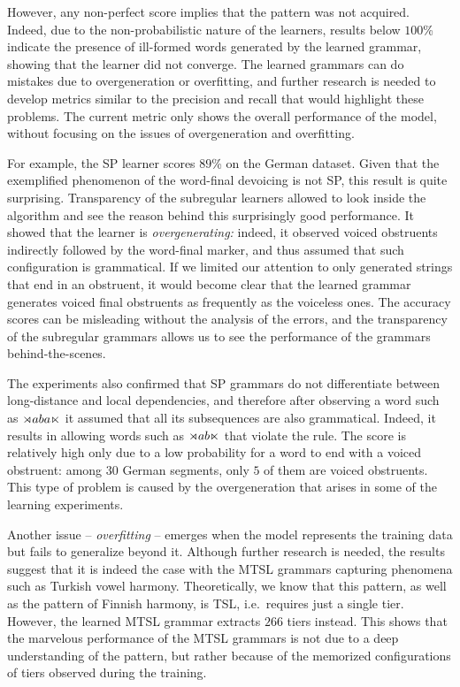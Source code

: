 However, any non-perfect score implies that the pattern was not acquired.
Indeed, due to the non-probabilistic nature of the learners, results below $100$\% indicate the presence of ill-formed words generated by the learned grammar, showing that the learner did not converge.
The learned grammars can do mistakes due to overgeneration or overfitting, and further research is needed to develop metrics similar to the precision and recall that would highlight these problems.
The current metric only shows the overall performance of the model, without focusing on the issues of overgeneration and overfitting.

For example, the SP learner scores $89$\% on the German dataset. 
Given that the exemplified phenomenon of the word-final devoicing is not SP, this result is quite surprising.
Transparency of the subregular learners allowed to look inside the algorithm and see the reason behind this surprisingly good performance. 
It showed that the learner is \emph{overgenerating:} indeed, it observed voiced obstruents indirectly followed by the word-final marker, and thus assumed that such configuration is grammatical.
If we limited our attention to only generated strings that end in an obstruent, it would become clear that the learned grammar generates voiced final obstruents as frequently as the voiceless ones.
The accuracy scores can be misleading without the analysis of the errors, and the transparency of the subregular grammars allows us to see the performance of the grammars behind-the-scenes.

The experiments also confirmed that SP grammars do not differentiate between long-distance and local dependencies, and therefore after observing a word such as $\rtimes aba\ltimes$ it assumed that all its subsequences are also grammatical.
Indeed, it results in allowing words such as $\rtimes ab\ltimes$ that violate the rule.
The score is relatively high only due to a low probability for a word to end with a voiced obstruent: among $30$ German segments, only $5$ of them are voiced obstruents.
This type of problem is caused by the overgeneration that arises in some of the learning experiments.

Another issue -- \emph{overfitting} -- emerges when the model represents the training data but fails to generalize beyond it.
Although further research is needed, the results suggest that it is indeed the case with the MTSL grammars capturing phenomena such as Turkish vowel harmony.
Theoretically, we know that this pattern, as well as the pattern of Finnish harmony, is TSL, i.e.\ requires just a single tier.
However, the learned MTSL grammar extracts $266$ tiers instead.
This shows that the marvelous performance of the MTSL grammars is not due to a deep understanding of the pattern, but rather because of the memorized configurations of tiers observed during the training.


